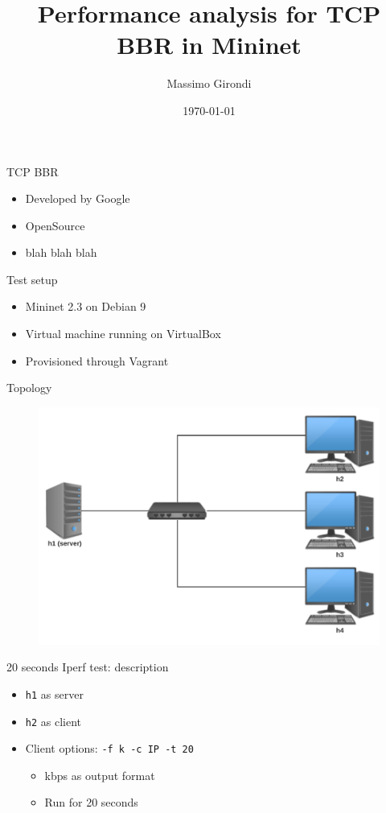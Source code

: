 \documentclass[13pt,aspectratio=43]{beamer}
\title{
	Performance analysis for TCP BBR in Mininet
}
\date{\today}
\author{Massimo Girondi}
\begin{document}
\maketitle

\begin{frame}{TCP BBR}
	\begin{itemize}
		\item Developed by Google
		\item OpenSource
		\item blah blah blah
	\end{itemize}
\end{frame}

\begin{frame}{Test setup}
	\begin{itemize}
		\item Mininet 2.3 on Debian 9
		\item Virtual machine running on VirtualBox
		\item Provisioned through Vagrant 
	\end{itemize}
\end{frame}
\begin{frame}{Topology}
  \begin{figure}
	  \includegraphics[width=\textwidth,height=\textheight,keepaspectratio]{network.pdf}
  \end{figure}
\end{frame}

\begin{frame}{20 seconds Iperf test: description}
	\begin{itemize}
		\item \texttt{h1} as server
		\item \texttt{h2} as client
		\item Client options: \texttt{-f k -c IP -t 20 }
			\begin{itemize}
				\item[-f k] kbps as output format
				\item[-t 20] Run for 20 seconds
			\end{itemize}
	\end{itemize}
\end{frame}
\end{document}
